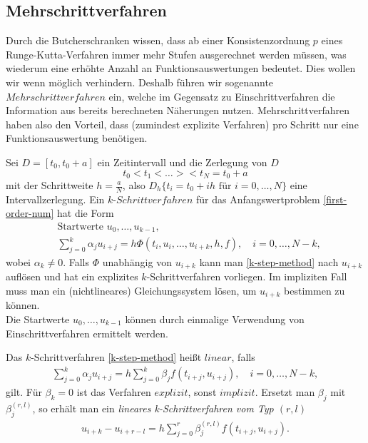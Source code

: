 \subsection{Mehrschrittverfahren}
Durch die Butcherschranken wissen, dass ab einer Konsistenzordnung $p$ eines Runge-Kutta-Verfahren immer mehr Stufen
ausgerechnet werden müssen, was wiederum eine erhöhte Anzahl an Funktionsauswertungen bedeutet. Dies wollen wir wenn
möglich verhindern. Deshalb führen wir sogenannte $Mehrschrittverfahren$ ein, welche im Gegensatz zu Einschrittverfahren
die Information aus bereits berechneten Näherungen nutzen. Mehrschrittverfahren haben also den Vorteil, dass
(zumindest explizite Verfahren) pro Schritt nur eine Funktionsauswertung benötigen.
\begin{definition}
    Sei $D = \left[ t_0, t_0 +a \right]$ ein Zeitintervall und die Zerlegung von $D$
    \[
        t_0 < t_1 < \dots >< t_N = t_0 + a
    \]
    mit der Schrittweite $h = \frac{a}{N}$, also $D_h \{ t_i = t_0 + ih \text{ für } i = 0, \dots, N\}$ eine
    Intervallzerlegung. Ein $k$-$Schrittverfahren$ für das Anfangswertproblem \eqref{first-order-num} hat die Form
    \begin{align}
        \label{k-step-method}
        &\text{Startwerte } u_0, \dots, u_{k-1}, \nonumber \\
        & \sum_{j=0}^{k} \alpha_j u_{i+j} = h \Phi(t_i, u_i, \dots, u_{i+k},h,f), \quad i=0,\dots,N-k,
    \end{align}
    wobei $\alpha_k \neq 0$. Falls $\Phi$ unabhängig von $u_{i+k}$ kann man \eqref{k-step-method} nach $u_{i+k}$
    auflösen und hat ein explizites $k$-Schrittverfahren vorliegen. Im impliziten Fall muss man ein (nichtlineares)
    Gleichungssystem lösen, um $u_{i+k}$ bestimmen zu können.\\
    Die Startwerte $u_0, \dots, u_{k-1}$ können durch einmalige Verwendung von Einschrittverfahren ermittelt werden.
\end{definition}
\begin{definition}
    Das $k$-Schrittverfahren \eqref{k-step-method} heißt $linear$, falls
    \begin{align}
        \label{k-step-linear}
        \sum_{j=0}^{k} \alpha_j u_{i+j} = h \sum_{j=0}^{k} \beta_j f(t_{i+j}, u_{i+j}), \quad i = 0, \dots, N-k,
    \end{align}
    gilt. Für $\beta_k = 0$ ist das Verfahren $explizit$, sonst $implizit$.
    Ersetzt man $\beta_j$ mit $\beta_j^{(r,l)}$, so erhält man ein \textit{lineares k-Schrittverfahren vom Typ $(r,l)$}
    \begin{align}
        \label{k-step-rl}
        u_{i+k}-u_{i+r-l} = h \sum_{j=0}^{r} \beta_j^{(r,l)} f(t_{i+j},u_{i+j}).
    \end{align}

\end{definition}

